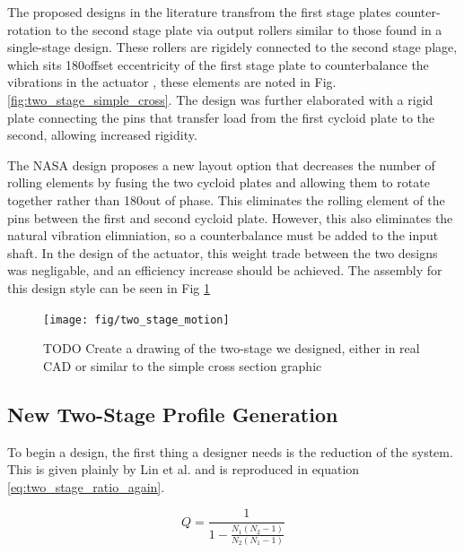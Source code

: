 The proposed designs in the literature transfrom the first stage plates counter-rotation to the second stage plate via output rollers similar to those found in a single-stage design. These rollers are rigidely connected to the second stage plage, which sits 180\textdegree offset eccentricity of the first stage plate to counterbalance the vibrations in the actuator \cite{ref:new_two_stage}, these elements are noted in Fig. \ref{fig:two_stage_simple_cross}. The design was further elaborated with a rigid plate connecting the pins that transfer load from the first cycloid plate to the second, allowing increased rigidity. 

The NASA design proposes a new layout option that decreases the number of rolling elements by fusing the two cycloid plates and allowing them to rotate together rather than 180\textdegree out of phase. This eliminates the rolling element of the pins between the first and second cycloid plate. However, this also eliminates the natural vibration elimniation, so a counterbalance must be added to the input shaft. In the design of the actuator, this weight trade between the two designs was negligable, and an efficiency increase should be achieved. The assembly for this design style can be seen in Fig \ref{fig:two_stage_design} 

\begin{figure}[h]
	\centering
	\texttt{[image: fig/two\_stage\_motion]}
   \caption{TODO Create a drawing of the two-stage we designed, either in real CAD or similar to the simple cross section graphic}
   \label{fig:two_stage_design}
\end{figure}


\subsection{New Two-Stage Profile Generation} \label{ch:dual:initial_equation:profiles}

To begin a design, the first thing a designer needs is the reduction of the system. This is given plainly by Lin et al. and is reproduced in equation \ref{eq:two_stage_ratio_again}.

\begin{equation} \label{eq:two_stage_ratio_again}
Q = \frac{1}{1 - \frac{N_1 (N_2-1)}{N_2 (N_1-1)}}
\end{equation}


